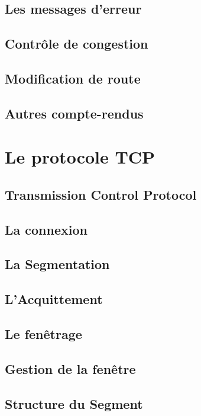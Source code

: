 \documentclass[12pt]{article}
\begin{document}
\subsection{Les messages d’erreur}

\subsection{Contrôle de congestion}

\subsection{Modification de route}

\subsection{Autres compte-rendus}

\section{Le protocole TCP}

\subsection{Transmission Control Protocol}

\subsection{La connexion}


\subsection{La Segmentation}


\subsection{L’Acquittement}


\subsection{Le fenêtrage}


\subsection{Gestion de la fenêtre}


\subsection{Structure du Segment}
\end{document}
